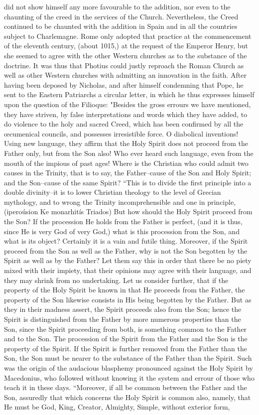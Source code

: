 did not show himself any more favourable to the addition, nor even to the chaunting of the creed in the services of the Church. Nevertheless, the Creed continued to be chaunted with the addition in Spain and in all the countries subject to Charlemagne. Rome only adopted that practice at the commencement of the eleventh century, (about 1015,) at the request of the Emperor Henry, but she seemed to agree with the other Western churches as to the substance of the doctrine. It was thus that Photius could justly reproach the Roman Church as well as other Western churches with admitting an innovation in the faith. After having been deposed by Nicholas, and after himself condemning that Pope, he sent to the Eastern Patriarchs a circular letter, in which he thus expresses himself upon the question of the Filioque: "Besides the gross errours we have mentioned, they have striven, by false interpretations and words which they have added, to do violence to the holy and sacred Creed, which has been confirmed by all the œcumenical councils, and possesses irresistible force. O diabolical inventions! Using new language, they affirm that the Holy Spirit does not proceed from the Father only, but from the Son also! Who ever heard such language, even from the mouth of the impious of past ages! Where is the Christian who could admit two causes in the Trinity, that is to say, the Father--cause of the Son and Holy Spirit; and the Son--cause of the same Spirit? “This is to divide the first principle into a double divinity--it is to lower Christian theology to the level of Grecian mythology, and to wrong the Trinity incomprehensible and one in principle, (iperoúsion Ke monarhitís Triados) But how should the Holy Spirit proceed from the Son? If the procession He holds from the Father is perfect, (and it is thus, since He is very God of very God,) what is this procession from the Son, and what is its object? Certainly it is a vain and futile thing. Moreover, if the Spirit proceed from the Son as well as the Father, why is not the Son begotten by the Spirit as well as by the Father? Let them say this in order that there be no piety mixed with their impiety, that their opinions may agree with their language, and they may shrink from no undertaking. Let us consider further, that if the property of the Holy Spirit be known in that He proceeds from the Father, the property of the Son likewise consists in His being begotten by the Father. But as they in their madness assert, the Spirit proceeds also from the Son; hence the Spirit is distinguished from the Father by more numerous properties than the Son, since the Spirit proceeding from both, is something common to the Father and to the Son. The procession of the Spirit from the Father and the Son is the property of the Spirit. If the Spirit is further removed from the Father than the Son, the Son must be nearer to the substance of the Father than the Spirit. Such was the origin of the audacious blasphemy pronounced against the Holy Spirit by Macedonius, who followed without knowing it the system and errour of those who teach it in these days. “Moreover, if all be common between the Father and the Son, assuredly that which concerns the Holy Spirit is common also, namely, that He must be God, King, Creator, Almighty, Simple, without exterior form, 